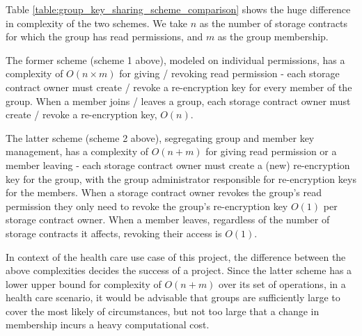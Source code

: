 Table \ref{table:group_key_sharing_scheme_comparison} shows the huge difference in complexity of the two schemes. We take $n$ as the number of storage contracts for which the group has read permissions, and $m$ as the group membership. 

The former scheme (scheme 1 above), modeled on individual permissions, has a complexity of $O(n \times m)$ for giving / revoking read permission - each storage contract owner must create / revoke a re-encryption key for every member of the group. When a member joins / leaves a group, each storage contract owner must create / revoke a re-encryption key, $O(n)$.

The latter scheme (scheme 2 above), segregating group and member key management, has a complexity of $O(n + m)$ for giving read permission or a member leaving - each storage contract owner must create a (new) re-encryption key for the group, with the group administrator responsible for re-encryption keys for the members. When a storage contract owner revokes the group's read permission they only need to revoke the group's re-encryption key $O(1)$ per storage contract owner. When a member leaves, regardless of the number of storage contracts it affects, revoking their access is $O(1)$.

In context of the health care use case of this project, the difference between the above complexities decides the success of a project. Since the latter scheme has a lower upper bound for complexity of $O(n + m)$ over its set of operations, in a health care scenario, it would be advisable that groups are sufficiently large to cover the most likely of circumstances, but not too large that a change in membership incurs a heavy computational cost.
